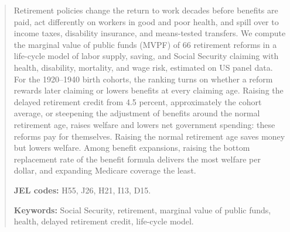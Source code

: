 \begin{abstract}
\noindent Retirement policies change the return to work decades before benefits are paid, act differently on workers in good and poor health, and spill over to income taxes, disability insurance, and means-tested transfers. We compute the marginal value of public funds (MVPF) of 66 retirement reforms in a life-cycle model of labor supply, saving, and Social Security claiming with health, disability, mortality, and wage risk, estimated on US panel data. For the 1920--1940 birth cohorts, the ranking turns on whether a reform rewards later claiming or lowers benefits at every claiming age. Raising the delayed retirement credit from 4.5 percent, approximately the cohort average, or steepening the adjustment of benefits around the normal retirement age, raises welfare and lowers net government spending: these reforms pay for themselves. Raising the normal retirement age saves money but lowers welfare. Among benefit expansions, raising the bottom replacement rate of the benefit formula delivers the most welfare per dollar, and expanding Medicare coverage the least.

\medskip
\noindent\textbf{JEL codes:} H55, J26, H21, I13, D15.

\noindent\textbf{Keywords:} Social Security, retirement, marginal value of public funds, health, delayed retirement credit, life-cycle model.
\end{abstract}
